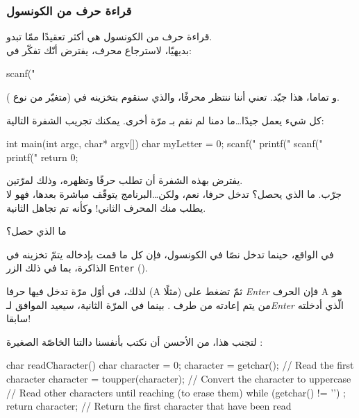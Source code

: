 \subsubsection{قراءة حرف من الكونسول}
قراءة حرف من الكونسول هي أكثر تعقيدًا ممّا تبدو.\\
بديهيّا، لاسترجاع محرف، يفترض أنّك تفكّر في:

\begin{Csource}
scanf("%
\end{Csource}

و تماما، هذا جيّد.
تعني أننا ننتظر محرفًا، والذي سنقوم بتخزينه في
(متغيّر من نوع
).


كل شيء يعمل جيدًا\dots ما دمنا لم نقم بـ
مرّة أخرى. يمكنك تجريب الشفرة التالية:

\begin{Csource}
int main(int argc, char* argv[])
{
 	char myLetter = 0;
 	scanf("%
 	printf("%
 	scanf("%
 	printf("%
 	return 0;
}
\end{Csource}

يفترض بهذه الشفرة أن تطلب حرفًا وتظهره، وذلك لمرّتين.\\
جرّب. ما الذي يحصل؟ تدخل حرفا، نعم، ولكن\dots البرنامج يتوقّف مباشرة بعدها، فهو لا يطلب منك المحرف الثاني! وكأنه تم تجاهل
الثانية.

\begin{question}
ما الذي حصل؟
\end{question}

في الواقع، حينما تدخل نصًا في الكونسول، فإن كل ما قمت بإدخاله يتمّ تخزينه في الذاكرة، بما في ذلك الزر
\texttt{Enter}
().

لذلك، في أوّل مرّة تدخل فيها حرفا
(\textenglish{A}
مثلًا) ثمّ تضغط على
\textit{\textenglish{Enter}}
فإن الحرف
\textenglish{A}
هو من يتم إعادته من طرف
.
بينما في المرّة الثانية،
سيعيد
الموافق لـ\textit{\textenglish{Enter}}
الّذي أدخلته سابقا!

لتجنب هذا، من الأحسن أن نكتب بأنفسنا دالتنا الخاصّة الصغيرة
:

\begin{Csource}
char readCharacter()
{
  char character = 0;
  character = getchar(); // Read the first character
  character = toupper(character); // Convert the character to uppercase
  // Read other characters until reaching \n (to erase them)
  while (getchar() != '\n') ;
  return character; // Return the first character that have been read
}
\end{Csource}

